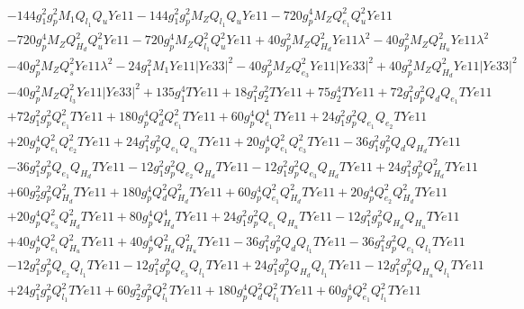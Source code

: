 \begin{align}
 &-144 g_{1}^{2} g_{p}^{2} M_1 Q_{l_1} Q_{u} Ye11 -144 g_{1}^{2} g_{p}^{2} M_Z Q_{l_1} Q_{u} Ye11 -720 g_{p}^{4} M_Z Q_{e_{1}}^{2} Q_{u}^{2} Ye11 \nonumber \\ 
 &-720 g_{p}^{4} M_Z Q_{H_d}^{2} Q_{u}^{2} Ye11 -720 g_{p}^{4} M_Z Q_{l_1}^{2} Q_{u}^{2} Ye11 +40 g_{p}^{2} M_Z Q_{H_d}^{2} Ye11 \lambda^{2} -40 g_{p}^{2} M_Z Q_{H_u}^{2} Ye11 \lambda^{2} \nonumber \\ 
 &-40 g_{p}^{2} M_Z Q_{s}^{2} Ye11 \lambda^{2} -24 g_{1}^{2} M_1 Ye11 |Ye33|^2 -40 g_{p}^{2} M_Z Q_{e_3}^{2} Ye11 |Ye33|^2 +40 g_{p}^{2} M_Z Q_{H_d}^{2} Ye11 |Ye33|^2 \nonumber \\ 
 &-40 g_{p}^{2} M_Z Q_{l_3}^{2} Ye11 |Ye33|^2 +135 g_{1}^{4} TYe11 +18 g_{1}^{2} g_{2}^{2} TYe11 +75 g_{2}^{4} TYe11 +72 g_{1}^{2} g_{p}^{2} Q_{d} Q_{e_{1}} TYe11 \nonumber \\ 
 &+72 g_{1}^{2} g_{p}^{2} Q_{e_{1}}^{2} TYe11 +180 g_{p}^{4} Q_{d}^{2} Q_{e_{1}}^{2} TYe11 +60 g_{p}^{4} Q_{e_{1}}^{4} TYe11 +24 g_{1}^{2} g_{p}^{2} Q_{e_{1}} Q_{e_{2}} TYe11 \nonumber \\ 
 &+20 g_{p}^{4} Q_{e_{1}}^{2} Q_{e_{2}}^{2} TYe11 +24 g_{1}^{2} g_{p}^{2} Q_{e_{1}} Q_{e_3} TYe11 +20 g_{p}^{4} Q_{e_{1}}^{2} Q_{e_3}^{2} TYe11 -36 g_{1}^{2} g_{p}^{2} Q_{d} Q_{H_d} TYe11 \nonumber \\ 
 &-36 g_{1}^{2} g_{p}^{2} Q_{e_{1}} Q_{H_d} TYe11 -12 g_{1}^{2} g_{p}^{2} Q_{e_{2}} Q_{H_d} TYe11 -12 g_{1}^{2} g_{p}^{2} Q_{e_3} Q_{H_d} TYe11 +24 g_{1}^{2} g_{p}^{2} Q_{H_d}^{2} TYe11 \nonumber \\ 
 &+60 g_{2}^{2} g_{p}^{2} Q_{H_d}^{2} TYe11 +180 g_{p}^{4} Q_{d}^{2} Q_{H_d}^{2} TYe11 +60 g_{p}^{4} Q_{e_{1}}^{2} Q_{H_d}^{2} TYe11 +20 g_{p}^{4} Q_{e_{2}}^{2} Q_{H_d}^{2} TYe11 \nonumber \\ 
 &+20 g_{p}^{4} Q_{e_3}^{2} Q_{H_d}^{2} TYe11 +80 g_{p}^{4} Q_{H_d}^{4} TYe11 +24 g_{1}^{2} g_{p}^{2} Q_{e_{1}} Q_{H_u} TYe11 -12 g_{1}^{2} g_{p}^{2} Q_{H_d} Q_{H_u} TYe11 \nonumber \\ 
 &+40 g_{p}^{4} Q_{e_{1}}^{2} Q_{H_u}^{2} TYe11 +40 g_{p}^{4} Q_{H_d}^{2} Q_{H_u}^{2} TYe11 -36 g_{1}^{2} g_{p}^{2} Q_{d} Q_{l_1} TYe11 -36 g_{1}^{2} g_{p}^{2} Q_{e_{1}} Q_{l_1} TYe11 \nonumber \\ 
 &-12 g_{1}^{2} g_{p}^{2} Q_{e_{2}} Q_{l_1} TYe11 -12 g_{1}^{2} g_{p}^{2} Q_{e_3} Q_{l_1} TYe11 +24 g_{1}^{2} g_{p}^{2} Q_{H_d} Q_{l_1} TYe11 -12 g_{1}^{2} g_{p}^{2} Q_{H_u} Q_{l_1} TYe11 \nonumber \\ 
 &+24 g_{1}^{2} g_{p}^{2} Q_{l_1}^{2} TYe11 +60 g_{2}^{2} g_{p}^{2} Q_{l_1}^{2} TYe11 +180 g_{p}^{4} Q_{d}^{2} Q_{l_1}^{2} TYe11 +60 g_{p}^{4} Q_{e_{1}}^{2} Q_{l_1}^{2} TYe11 \nonumber \\ 

\end{align}
